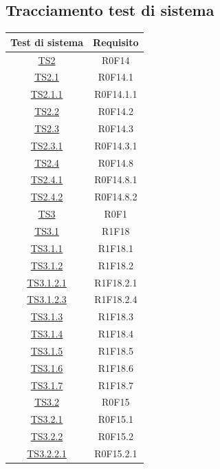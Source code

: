 \documentclass[../PianoDiQualifica.tex]{subfiles}
\begin{document}
\subsection{Tracciamento test di sistema}
	\normalsize
	\begin{longtable}{|c|c|}
		\hline
		\textbf{Test di sistema} & \textbf{Requisito}\\
		\hline
		\endhead
		\hyperlink{TS2}{TS2} & R0F14  \\
		\hline
		\hyperlink{TS2.1}{TS2.1} & R0F14.1   \\
		\hline
		\hyperlink{TS2.1.1}{TS2.1.1} & R0F14.1.1   \\
		\hline
		\hyperlink{TS2.2}{TS2.2} & R0F14.2   \\
		\hline
		\hyperlink{TS2.3}{TS2.3} & R0F14.3   \\
		\hline
		\hyperlink{TS2.3.1}{TS2.3.1} & R0F14.3.1   \\
		\hline
		\hyperlink{TS2.4}{TS2.4} & R0F14.8   \\
		\hline
		\hyperlink{TS2.4.1}{TS2.4.1} & R0F14.8.1   \\
		\hline
		\hyperlink{TS2.4.2}{TS2.4.2} & R0F14.8.2   \\
		\hline
		\hyperlink{TS3}{TS3} & R0F1   \\
		\hline
		\hyperlink{TS3.1}{TS3.1} & R1F18   \\
		\hline
		\hyperlink{TS3.1.1}{TS3.1.1} & R1F18.1   \\
		\hline
		\hyperlink{TS3.1.2}{TS3.1.2} & R1F18.2   \\
		\hline
		\hyperlink{TS3.1.2.1}{TS3.1.2.1} & R1F18.2.1   \\
		\hline
		\hyperlink{TS3.1.2.3}{TS3.1.2.3} & R1F18.2.4   \\
		\hline
		\hyperlink{TS3.1.3}{TS3.1.3} & R1F18.3   \\
		\hline
		\hyperlink{TS3.1.4}{TS3.1.4} & R1F18.4   \\
		\hline
		\hyperlink{TS3.1.5}{TS3.1.5} & R1F18.5   \\
		\hline
		\hyperlink{TS3.1.6}{TS3.1.6} & R1F18.6   \\
		\hline
		\hyperlink{TS3.1.7}{TS3.1.7} & R1F18.7   \\
		\hline
		\hyperlink{TS3.2}{TS3.2} & R0F15   \\
		\hline
		\hyperlink{TS3.2.1}{TS3.2.1} & R0F15.1   \\
		\hline
		\hyperlink{TS3.2.2}{TS3.2.2} & R0F15.2   \\
		\hline
		\hyperlink{TS3.2.2.1}{TS3.2.2.1} & R0F15.2.1   \\

\end{longtable}
\end{document}
